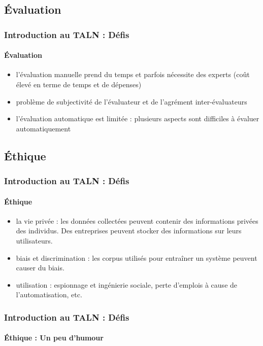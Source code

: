 \documentclass[xcolor=table]{beamer}
\begin{document}
\subsection{Évaluation}

\begin{frame}
\frametitle{Introduction au TALN : Défis}
\framesubtitle{Évaluation}

\begin{itemize}
	\item l'évaluation manuelle prend du temps et parfois nécessite des experts (coût élevé en terme de temps et de dépenses)
	\item problème de subjectivité de l'évaluateur et de l'agrément inter-évaluateurs
	\item l'évaluation automatique est limitée : plusieurs aspects sont difficiles à évaluer automatiquement
\end{itemize}

\end{frame}

\subsection{Éthique}

\begin{frame}
\frametitle{Introduction au TALN : Défis}
\framesubtitle{Éthique}

\begin{itemize}
	\item la vie privée : les données collectées peuvent contenir des informations privées des individus. Des entreprises peuvent stocker des informations sur leurs utilisateurs. 
	\item biais et discrimination : les corpus utilisés pour entraîner un système peuvent causer du biais.
	\item utilisation : espionnage et ingénierie sociale, perte d'emplois à cause de l'automatisation, etc.
\end{itemize}

\end{frame}

\begin{frame}
\frametitle{Introduction au TALN : Défis}
\framesubtitle{Éthique : Un peu d'humour}

\begin{center}
\end{center}

\end{frame}

\end{document}
